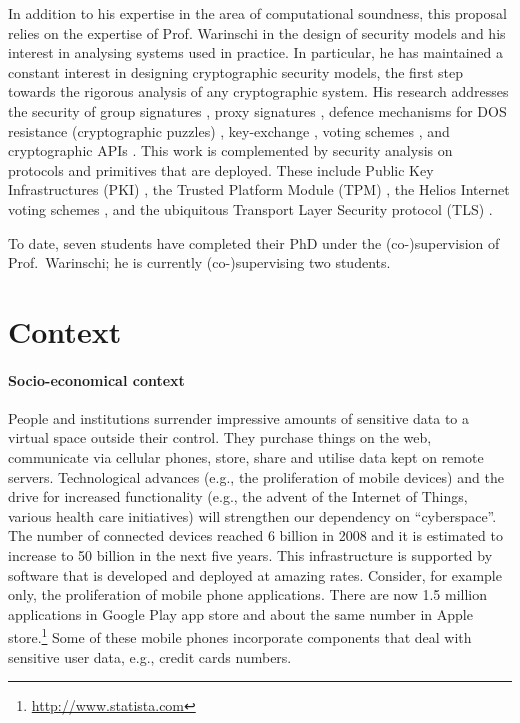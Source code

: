 \documentclass[10pt]{article}
\begin{document}
In addition to his expertise in the area of computational soundness, this proposal relies on the expertise of Prof. Warinschi in the design of security models and his interest in analysing systems used in practice. In particular, he has maintained a constant interest in designing cryptographic security models, the first step towards the rigorous analysis of any cryptographic system. 
His research addresses the security of group signatures \cite{BMW03}, proxy signatures \cite{proxies}, defence mechanisms for DOS resistance (cryptographic puzzles) \cite{puzzles},  key-exchange \cite{ke}, voting schemes \cite{helios}, and cryptographic APIs \cite{KSW11}.
This work is complemented by security analysis on protocols and primitives that are deployed.   These include Public Key Infrastructures (PKI) \cite{boldyreva07acloser}, the Trusted Platform Module (TPM) \cite{pcas}, the Helios Internet voting schemes \cite{helios}, and the ubiquitous Transport Layer Security protocol (TLS) \cite{tls}. 

To date, seven students have completed their PhD under the (co-)supervision of Prof.~Warinschi; he is currently (co-)supervising two 
students.


\section{Context}


\paragraph{Socio-economical context}
People and institutions surrender impressive amounts of sensitive data to a virtual space outside
their control.
They purchase things on the web, communicate via cellular phones, store, share and utilise data kept on remote servers.
Technological advances (e.g., the proliferation of mobile devices) and the drive for increased
functionality (e.g., the advent of the Internet of Things, various health care initiatives) will
strengthen our dependency on ``cyberspace''.
The number of connected devices reached 6 billion in 2008 and it is estimated to increase to 50
billion in the next five years.
This infrastructure is supported by software that is developed and deployed at amazing rates. 
Consider, for example only, the proliferation of mobile phone applications.
There are now 1.5 million applications in Google Play app store and about the same
number in Apple store.\footnote{\url{http://www.statista.com}}
Some of these mobile phones incorporate components that deal with sensitive user data, e.g., credit cards numbers.   
\end{document}
